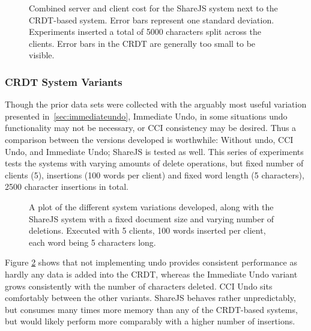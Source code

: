 \documentclass[12pt,a4paper,twoside,openright]{report}
\begin{document}
				\begin{figure}[htb]
					\centering
					
					\caption[Memory Consumption versus Replication] {Combined server and client cost for the ShareJS system next to the CRDT-based system. Error bars represent one standard deviation. Experiments inserted a total of 5000 characters split across the clients. Error bars in the CRDT are generally too small to be visible.}
					\label{fig:memvsreplication}
				\end{figure}
				
			\subsubsection{CRDT System Variants}
				Though the prior data sets were collected with the arguably most useful variation presented in~\cref{sec:immediateundo}, Immediate Undo, in some situations undo functionality may not be necessary, or CCI consistency may be desired. Thus a comparison between the versions developed is worthwhile: Without undo, CCI Undo, and Immediate Undo; ShareJS is tested as well. This series of experiments tests the systems with varying amounts of delete operations, but fixed number of clients (5), insertions (100 words per client) and fixed word length (5 characters), 2500 character insertions in total.
				
				\begin{figure}[htb]
					\centering
					
					\caption[Behavior of System Variants - Memory] {A plot of the different system variations developed, along with the ShareJS system with a fixed document size and varying number of deletions. Executed with 5 clients, 100 words inserted per client, each word being 5 characters long.}
					\label{fig:variantsmemory}
				\end{figure}
				
				Figure \ref{fig:variantsmemory} shows that not implementing undo provides consistent performance as hardly any data is added into the CRDT, whereas the Immediate Undo variant grows consistently with the number of characters deleted. CCI Undo sits comfortably between the other variants. ShareJS behaves rather unpredictably, but consumes many times more memory than any of the CRDT-based systems, but would likely perform more comparably with a higher number of insertions.
				
\end{document}
